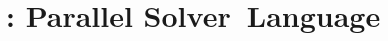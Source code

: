 \documentclass[a4paper,11pt,twoside,parskip=half,numbers=noenddot,bibliography=totocnumbered,listof = totoc]{scrbook}
\begin{document}

\frontmatter


%

\cleardoublepage
\dominitoc
\tableofcontents
\cleardoublepage
%
%
%

\mainmatter

%
%
\part{\posl{}: Parallel  Solver~Language\hfill}

%
%

\footnotesize
{} %

\normalsize

%
%
%
%
%
%
%
%
%
%
\end{document}
